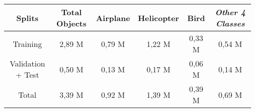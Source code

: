 \begin{tabular}{ c c c c c c }
  \toprule[1.5pt]
  Splits & Total Objects & Airplane & Helicopter & Bird & \emph{Other 4 Classes}\\
  \midrule
  Training & 2,89 M & 0,79 M& 1,22 M& 0,33 M& 0,54 M\\
  Validation + Test &0,50 M &0,13 M & 0,17 M&0,06 M&0,14 M\\
  \midrule
  Total &3,39 M &0,92 M & 1,39 M&0,39 M&0,69 M\\
  \bottomrule[1.5pt]
\end{tabular}